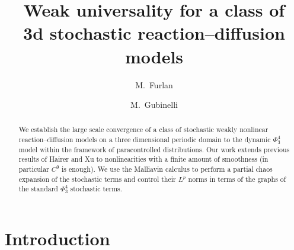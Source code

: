 %

\newcommand{\axiomtext}{Assumption}



\title{
  Weak universality for a class of\\
  3d stochastic reaction--diffusion models
}

\author{
  M.~Furlan
  \and
  M.~Gubinelli
}

\maketitle

\begin{abstract}
  We establish the large scale convergence of a class of stochastic weakly
  nonlinear reaction--diffusion models on a three dimensional periodic domain
  to the dynamic $\Phi^4_3$ model within the framework of paracontrolled
  distributions. Our work extends previous results of Hairer and Xu to
  nonlinearities with a finite amount of smoothness (in particular $C^9$ is
  enough). We use the Malliavin calculus to perform a partial chaos expansion
  of the stochastic terms and control their $L^p$ norms in terms of the graphs
  of the standard $\Phi^4_3$ stochastic terms. 
\end{abstract}


\tableofcontents

\section{Introduction}

